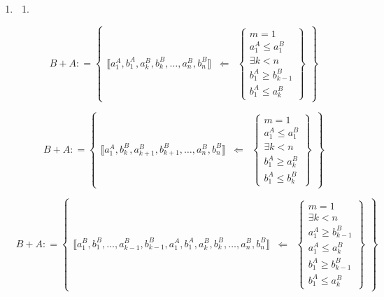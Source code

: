 \begin{enumerate}
\def\labelenumi{\arabic{enumi}.}
\setcounter{enumi}{3}
\item
  \begin{enumerate}
  \def\labelenumii{\arabic{enumii}.}
  \tightlist
  \item
  \end{enumerate}

  \[{{B + A}{: =}}\begin{Bmatrix}
  {⟦{{a_{1}^{A},b_{1}^{A}},{a_{k}^{B},b_{k}^{B}},\ldots,{a_{n}^{B},b_{n}^{B}}}⟧} & \Leftarrow & \begin{Bmatrix}
  {m = 1} \\
  {a_{1}^{A} \leq a_{1}^{B}} \\
  {\exists{k < n}} \\
  {b_{1}^{A} \geq b_{k - 1}^{B}} \\
  {b_{1}^{A} \leq a_{k}^{B}}
  \end{Bmatrix}
  \end{Bmatrix}\]

  \[{{B + A}{: =}}\begin{Bmatrix}
  {⟦{{a_{1}^{A},b_{k}^{B}},{a_{k + 1}^{B},b_{k + 1}^{B}},\ldots,{a_{n}^{B},b_{n}^{B}}}⟧} & \Leftarrow & \begin{Bmatrix}
  {m = 1} \\
  {a_{1}^{A} \leq a_{1}^{B}} \\
  {\exists{k < n}} \\
  {b_{1}^{A} \geq a_{k}^{B}} \\
  {b_{1}^{A} \leq b_{k}^{B}}
  \end{Bmatrix}
  \end{Bmatrix}\]

  \[{{B + A}{: =}}\begin{Bmatrix}
  {⟦{{a_{1}^{B},b_{1}^{B}},\ldots,{a_{k - 1}^{B},b_{k - 1}^{B}},{a_{1}^{A},b_{1}^{A}},{a_{k}^{B},b_{k}^{B}},\ldots,{a_{n}^{B},b_{n}^{B}}}⟧} & \Leftarrow & \begin{Bmatrix}
  {m = 1} \\
  {\exists{k < n}} \\
  {a_{1}^{A} \geq b_{k - 1}^{B}} \\
  {a_{1}^{A} \leq a_{k}^{B}} \\
  {b_{1}^{A} \geq b_{k - 1}^{B}} \\
  {b_{1}^{A} \leq a_{k}^{B}}
  \end{Bmatrix}
  \end{Bmatrix}\]


\end{enumerate}
